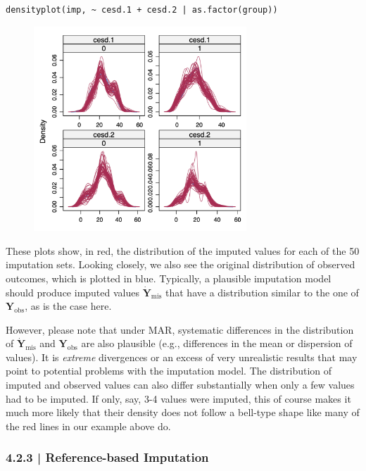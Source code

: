 \begin{lstlisting}
densityplot(imp, ~ cesd.1 + cesd.2 | as.factor(group))
\end{lstlisting}

\begin{figure}[H]
\includegraphics[width=8cm]{images/densityplot.png}
\centering
\end{figure}

These plots show, in red, the distribution of the imputed values for each of the 50 imputation sets. Looking closely, we also see the original distribution of observed outcomes, which is plotted in blue. Typically, a plausible imputation model should produce imputed values $\dot{\mathbf{Y}}_{\text{mis}}$ that have a distribution similar to the one of $\mathbf{Y}_{\text{obs}}$, as is the case here.

However, please note that under MAR, systematic differences in the distribution of $\dot{\mathbf{Y}}_{\text{mis}}$ and $\mathbf{Y}_{\text{obs}}$ are also plausible (e.g., differences in the mean or dispersion of values). It is \emph{extreme} divergences or an excess of very unrealistic results that may point to potential problems with the imputation model. The distribution of imputed and observed values can also differ substantially when only a few values had to be imputed. If only, say, 3-4 values were imputed, this of course makes it much more likely that their density does not follow a bell-type shape like many of the red lines in our example above do.

\subsubsection{{\normalfont\textsf{\textcolor{sBlue}{\small 4.2.3 |}}} Reference-based Imputation}

